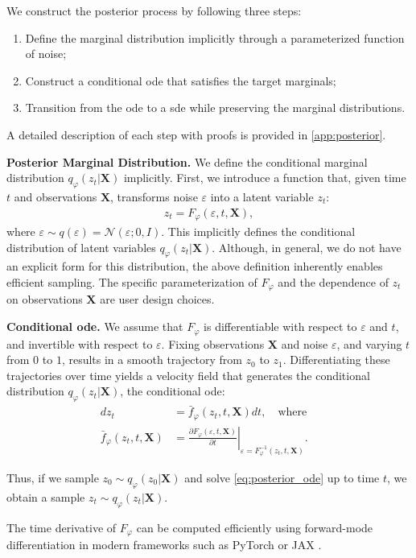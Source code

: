 \documentclass{article}
\def\N{\mathcal{N}}
\def\X{\mathbf{X}}
\def\e{\varepsilon}
\def\ph{\varphi}
\def\barf{\bar{f}}
\def\p{\partial}
\theoremstyle{plain}
\theoremstyle{definition}
\theoremstyle{remark}
\begin{document}
We construct the posterior process by following  three steps:
\begin{enumerate}
    \item Define the marginal distribution implicitly through a parameterized function of noise;
    \item Construct a conditional \gls{ode} that satisfies the target marginals;
    \item Transition from the \gls{ode} to a \gls{sde} while preserving the marginal distributions.
\end{enumerate}

A detailed description of each step with proofs is provided in \cref{app:posterior}.

\textbf{Posterior Marginal Distribution.} We define the conditional marginal distribution $q_\ph(z_t|\X)$ implicitly. First, we introduce a function that, given time $t$ and observations $\X$, transforms noise $\e$ into a latent variable $z_t$:
\begin{align}
    z_t = F_\ph(\e, t, \X),
    \label{eq:f}
\end{align}
where $\e \sim q(\e) = \N(\e; 0, I)$. This implicitly defines the conditional distribution of latent variables $q_\ph(z_t|\X)$. Although, in general, we do not have an explicit form for this distribution, the above definition inherently enables efficient sampling. The specific parameterization of $F_\ph$ and the dependence of $z_t$ on observations $\X$ are user design choices.


\textbf{Conditional \gls{ode}.} We assume that $F_\ph$ is differentiable with respect to $\e$ and $t$, and invertible with respect to $\e$. Fixing observations $\X$ and noise $\e$, and varying $t$ from $0$ to $1$, results in a smooth trajectory from $z_0$ to $z_1$. Differentiating these trajectories over time yields a velocity field that generates the conditional distribution $q_\ph(z_t|\X)$, the conditional \gls{ode}:
\begin{align}
    d z_t & = \barf_\ph(z_t, t, \X) d t, 
    \quad \textrm{where} \quad \label{eq:posterior_ode} \\
    \barf_\ph(z_t, t, \X) & = \left. \frac{\p F_\ph(\e, t, \X)}{\p t} \right|_{\e=F_\ph^{-1}(z_t, t, \X)}.
\end{align}


Thus, if we sample $z_0 \sim q_\ph(z_0|\X)$ and solve \cref{eq:posterior_ode} up to time $t$, we obtain a sample $z_t \sim q_\ph(z_t|\X)$. 


The time derivative of $F_\ph$ can be computed efficiently using forward-mode differentiation in modern frameworks such as PyTorch \cite{paszke2017automatic} or JAX \cite{jax2018github}.
\end{document}
